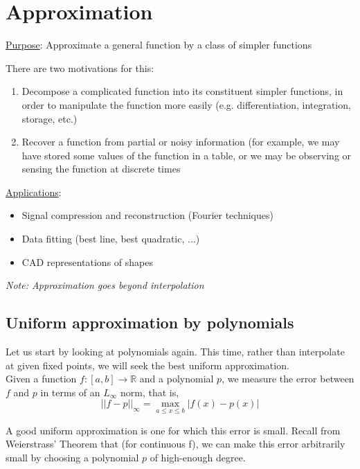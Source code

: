 \chapter{Approximation}
{\parindent0pt
\underline{Purpose}: Approximate a general function by a class of simpler functions

There are two motivations for this:
\begin{enumerate}
    \item Decompose a complicated function into its constituent simpler functions, in order to manipulate the function more easily (e.g. differentiation, integration, storage, etc.)
    \item Recover a function from partial or noisy information (for example, we may have stored some values of the function in a table, or we may be observing or sensing the function at discrete times
\end{enumerate}

\underline{Applications}:
\begin{itemize}
    \item Signal compression and reconstruction (Fourier techniques)
    \item Data fitting (best line, best quadratic, ...)
    \item CAD representations of shapes
\end{itemize}
\emph{Note: Approximation goes beyond interpolation}

\section{Uniform approximation by polynomials}
Let us start by looking at polynomials again. This time, rather than interpolate at given fixed points, we will seek the best uniform approximation. \\

Given a function $f:[a, b] \rightarrow \mathbb{R}$ and a polynomial $p$, we measure the error between $f$ and $p$ in terms of an $L_\infty$ norm, that is,
\begin{equation*}
    ||f - p||_\infty = \max_{a \leq x \leq b}{|f(x) - p(x)|}
\end{equation*}

A good uniform approximation is one for which this error is small. Recall from Weierstrass' Theorem that (for continuous f), we can make this error arbitrarily small by choosing a polynomial $p$ of high-enough degree. \\

}
